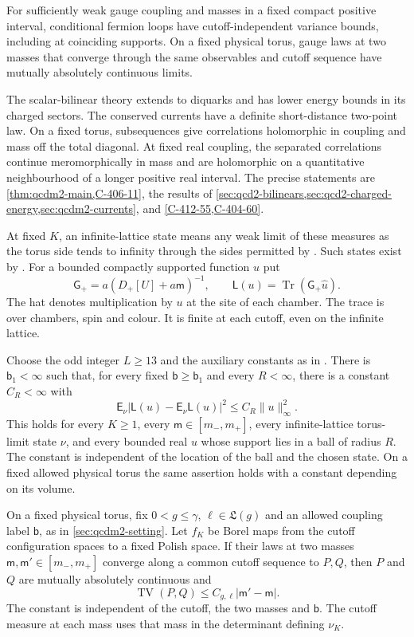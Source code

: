 \documentclass[11pt,letterpaper,reqno]{amsart}
\makeatletter
\theoremstyle{definition}
\newcommand{\ms@majorstart}{%
  \pushQED{\qed}\renewcommand{\qedsymbol}{$\blacksquare\square$}}
\newenvironment{theorem}[1][]{\ms@majorstart\ms@theorem[#1]}
  {\popQED\endms@theorem}
\newenvironment{theoremzero}{\ms@majorstart\ms@theoremzero}
  {\popQED\endms@theoremzero}
\theoremstyle{remark}
\makeatother
\begin{document}
\begin{theoremzero}
For sufficiently weak gauge coupling and masses in a fixed
compact positive interval, conditional fermion loops have
cutoff-independent variance bounds, including at coinciding
supports. On a fixed physical torus, gauge laws at two masses
that converge through the same observables and cutoff sequence
have mutually absolutely continuous limits.

The scalar-bilinear theory extends to diquarks and has lower
energy bounds in its charged sectors. The conserved currents
have a definite short-distance two-point law. On a fixed torus,
subsequences give correlations holomorphic in coupling and mass
off the total diagonal. At fixed real coupling, the separated
correlations continue meromorphically in mass and are holomorphic
on a quantitative neighbourhood of a longer positive real interval.
\end{theoremzero}
The precise statements are \cref{thm:qcdm2-main,C-406-11},
the results of \cref{sec:qcd2-bilinears,sec:qcd2-charged-energy,sec:qcdm2-currents},
and \cref{C-412-55,C-404-60}.

At fixed $K$, an infinite-lattice
state means any weak limit of these measures as the torus
side tends to infinity through the sides permitted by
\cite[Prop. 10.20]{QCDM1}. Such states exist by
\cite[Prop. 2.5]{QCDM1}. For a bounded compactly supported
function $u$ put
\[
 \mathsf G_+=a(D_+[U]+a\mathsf m)^{-1},\qquad
 \mathsf L(u)=\operatorname{Tr}(\mathsf G_+\hat u).
\]
The hat denotes multiplication by $u$ at the site of each
chamber. The trace is over chambers, spin and colour. It is
finite at each cutoff, even on the infinite lattice.

\begin{theorem}[Fluctuations and changes of mass]\label{thm:qcdm2-main}
Choose the odd integer $L\ge13$ and the auxiliary constants
as in \cite[Prop. 10.20]{QCDM1}. There is
$\mathsf b_1<\infty$ such that, for every fixed
$\mathsf b\ge\mathsf b_1$ and every $R<\infty$, there is a
constant $C_R<\infty$ with
\[
 \mathsf E_\nu\bigl|\mathsf L(u)-\mathsf E_\nu\mathsf L(u)\bigr|^2
 \le C_R\|u\|_\infty^2.
\]
This holds for every $K\ge1$, every
$\mathsf m\in[m_-,m_+]$, every infinite-lattice torus-limit
state $\nu$, and every bounded real $u$ whose support lies in
a ball of radius $R$. The constant is independent of the
location of the ball and the chosen state. On a fixed allowed
physical torus the same assertion holds with a constant
depending on its volume.


On a fixed physical torus, fix $0<g\le\gamma$,
$\ell\in\mathfrak L(g)$ and an allowed coupling label
$\mathsf b$, as in \cref{sec:qcdm2-setting}.
Let $f_K$ be Borel maps from the cutoff configuration spaces
to a fixed Polish space. If their laws at two masses
$\mathsf m,\mathsf m'\in[m_-,m_+]$ converge along a common
cutoff sequence to $P,Q$, then $P$ and $Q$ are mutually
absolutely continuous and
\[
 \operatorname{TV}(P,Q)\le C_{g,\ell}|\mathsf m'-\mathsf m|.
\]
The constant is independent of the cutoff, the two masses
and $\mathsf b$. The cutoff measure at each mass uses that
mass in the determinant defining $\nu_K$.
\end{theorem}
\end{document}
